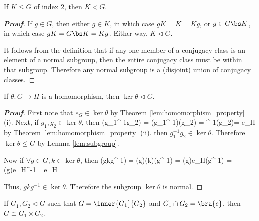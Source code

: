 \begin{lemma}\label{lem:normal_index_2}
If $K\leq G$ of index 2, then $K\lhd G$.%
\end{lemma}

\begin{proof}[\bf Proof]
If $g\in G$, then either $g\in K$, in which case $gK=K = Kg$, or $g\in G\bs K$, in which case $gK =G\bs K = Kg$. Either way, $K\lhd G$.

It follows from the definition that if any one member of a conjugacy class is an element of a normal subgroup, then the entire conjugacy class must be within that subgroup. Therefore any normal subgroup is a (disjoint) union of conjugacy classes.
\end{proof}


\begin{lemma}\label{lem:ker_normal}
If $\theta: G\to H$ is a homomorphism, then $\ker \theta \lhd G$.
\end{lemma}

\begin{proof}[\bf Proof]
First note that $e_G \in \ker \theta$ by Theorem \ref{lem:homomorphism_property} (i). Next, if $g_1,g_2 \in \ker\theta$, then
\be
\theta(g_1^{-1}g_2) = \theta(g_1^{-1})\theta(g_2) = ^{-1}\theta(g_2)= e_H
\ee
by Theorem \ref{lem:homomorphism_property} (ii). then $g_1^{-1}g_2 \in \ker\theta $. Therefore $\ker \theta \leq G$ by Lemma \ref{lem:subgroup}.

Now if $\forall g\in G, k\in \ker \theta$, then
\be
\theta(gkg^{-1}) = \theta(g)\theta(k)\theta(g^{-1}) = \theta(g)e_H\theta(g^{-1}) = \theta(g)e_H^{-1}=  e_H
\ee

Thus, $gkg^{-1} \in \ker \theta$. Therefore the subgroup $\ker \theta$ is normal.
\end{proof}


\begin{lemma}
If $G_1,G_2 \lhd G$ such that $G = \inner{G_1}{G_2}$ and $G_1\cap G_2 = \bra{e}$, then $G\cong G_1\times G_2$.
\end{lemma}

